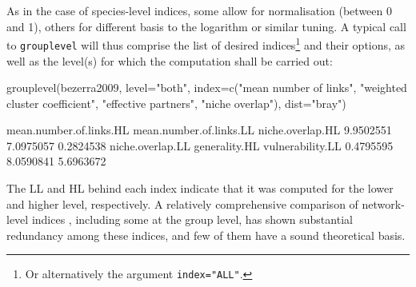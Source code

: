 \documentclass[a4paper, 11pt]{article}\usepackage[]{graphicx}\usepackage[]{color}
\begin{document}
\noindent As in the case of species-level indices, some allow for normalisation (between 0 and 1), others for different basis to the logarithm or similar tuning. A typical call to \texttt{grouplevel} will thus comprise the list of desired indices\footnote{Or alternatively the argument \texttt{index="ALL"}.} and their options, as well as the level(s) for which the computation shall be carried out:
\begin{Schunk}
\begin{Sinput}
grouplevel(bezerra2009, level="both", index=c("mean number of links", "weighted 
     cluster coefficient", "effective partners", "niche overlap"), dist="bray")
\end{Sinput}
\begin{Soutput}
mean.number.of.links.HL mean.number.of.links.LL        niche.overlap.HL 
              9.9502551               7.0975057               0.2824538 
       niche.overlap.LL           generality.HL        vulnerability.LL 
              0.4795595               8.0590841               5.6963672 
\end{Soutput}
\end{Schunk}
The LL and HL behind each index indicate that it was computed for the lower and higher level, respectively. A relatively comprehensive comparison of network-level indices \citep{Dormann2009}, including some at the group level, has shown substantial redundancy among these indices, and few of them have a sound theoretical basis.
\end{document}
